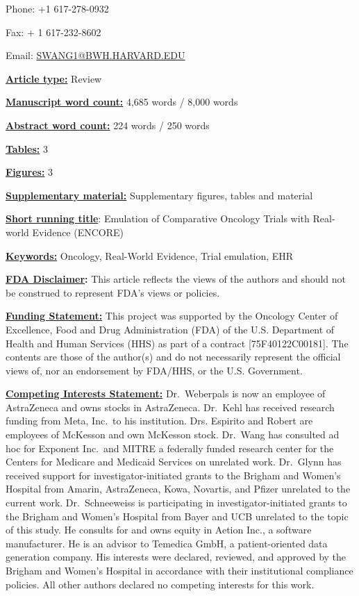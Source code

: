 \documentclass[
  letterpaper,
  DIV=11,
  numbers=noendperiod]{scrartcl}
\begin{document}
Phone: +1 617-278-0932

Fax: + 1 617-232-8602

Email: \url{SWANG1@BWH.HARVARD.EDU}

\ul{\textbf{Article type:}} Review

\ul{\textbf{Manuscript word count:}} 4,685 words / 8,000 words

\ul{\textbf{Abstract word count:}} 224 words / 250 words

\ul{\textbf{Tables:}} 3

\ul{\textbf{Figures:}} 3

\ul{\textbf{Supplementary material:}} Supplementary figures, tables and
material

\ul{\textbf{Short running title}}: Emulation of Comparative Oncology
Trials with Real-world Evidence (ENCORE)

\ul{\textbf{Keywords:}} Oncology, Real-World Evidence, Trial emulation,
EHR

\ul{\textbf{FDA Disclaimer}}\textbf{:} This article reflects the views
of the authors and should not be construed to represent FDA's views or
policies.

\ul{\textbf{Funding Statement:}} This project was supported by the
Oncology Center of Excellence, Food and Drug Administration (FDA) of the
U.S. Department of Health and Human Services (HHS) as part of a contract
{[}75F40122C00181{]}. The contents are those of the author(s) and do not
necessarily represent the official views of, nor an endorsement by
FDA/HHS, or the U.S. Government.

\ul{\textbf{Competing Interests Statement:}} Dr.~Weberpals is now an
employee of AstraZeneca and owns stocks in AstraZeneca. Dr.~Kehl has
received research funding from Meta, Inc.~to his institution. Drs.
Espirito and Robert are employees of McKesson and own McKesson stock.
Dr.~Wang has consulted ad hoc for Exponent Inc.~and MITRE a federally
funded research center for the Centers for Medicare and Medicaid
Services on unrelated work. Dr.~Glynn has received support for
investigator-initiated grants to the Brigham and Women's Hospital from
Amarin, AstraZeneca, Kowa, Novartis, and Pfizer unrelated to the current
work. Dr.~Schneeweiss is participating in investigator-initiated grants
to the Brigham and Women's Hospital from Bayer and UCB unrelated to the
topic of this study. He consults for and owns equity in Aetion Inc., a
software manufacturer. He is an advisor to Temedica GmbH, a
patient-oriented data generation company. His interests were declared,
reviewed, and approved by the Brigham and Women's Hospital in accordance
with their institutional compliance policies. All other authors declared
no competing interests for this work.
\end{document}
